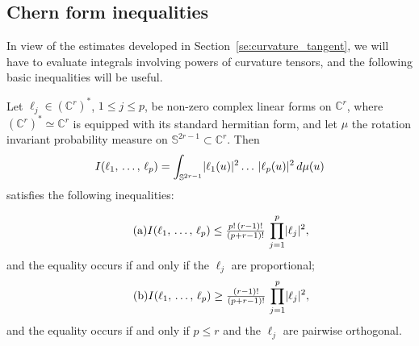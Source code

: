\documentclass[AHL,Unicode,longabstracts,published]{cedram}
\DeclarePairedDelimiter{\abs}{\lvert}{\rvert}
\newenvironment{eqlist}{
\begingroup \leftskip\parindent \rightskip\parindent \noindent
\begin{minipage}{\linewidth-2\parindent}} {
\end{minipage}
\endgroup}
\newcommand*\bC{\mathbb{C}}
\newcommand*\bS{\mathbb{S}}
\let\leq\leqslant
\begin{document}
\subsection{Chern form inequalities} In view of the estimates developed in Section~\ref{se:curvature_tangent}, we will have to evaluate integrals involving powers of curvature tensors, and the following basic inequalities will be useful.
\begin{lemm}\label{lemm:Chern_form_inequalities}
Let $\ell_j\in(\bC^r)^*$, $1\leq j\leq p$, be non-zero complex linear forms on $\bC^r$, where $(\bC^r)^*\simeq\bC^r$ is equipped with its standard hermitian form, and let $\mu$ the rotation invariant probability measure on $\bS^{2r-1}\subset\bC^r$. Then
\[
I(\ell_1,\,\dotsc,\,\ell_p)=\int_{\bS^{2r-1}}\abs{\ell_1(u)}^2\ldots\,\abs{\ell_p(u)}^2\, d\mu(u)
\]
satisfies the following inequalities:\\
\begin{eqlist}
\[
\tag{a}\label{item:Chern_form_inequality1}
I(\ell_1,\,\dotsc,\,\ell_p)
\le
\tfrac{p!\,(r-1)!}{ (p+r-1)!}\,\prod_{j=1}^p\abs{\ell_j}^2,
\]
and the equality occurs if and only if the $\ell_j$ are proportional;
\[
\tag{b}\label{item:Chern_form_inequality2}
I(\ell_1,\,\dotsc,\,\ell_p)
\ge
\tfrac{(r-1)!}{ (p+r-1)!}\,\prod_{j=1}^p\abs{\ell_j}^2,
\]
and the equality occurs if and only if $p\leq r$ and the $\ell_j$ are pairwise orthogonal.
\end{eqlist}
\end{lemm}
\end{document}
